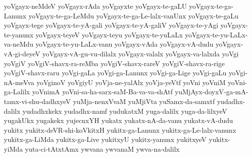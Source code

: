 {yoVgayx-neMdeV
yoVgayx-rAda
yoVgayxte
yoVgayx-te-gaLU
yoVgayx-te-ga-Lanunx
yoVgayx-te-ga-LeMdu
yoVgayx-te-ga-Le-lalx-vanUnx
yoVgayx-te-gaLu
yoVgayx-tege
yoVgayx-te-yA-gali
yoVgayx-te-yA-galiV
yoVgayx-te-yAgi
yoVgayx-te-yanunx
yoVgayx-teyeV
yoVgayx-teyu
yoVgayx-te-yuLaLx
yoVgayx-te-yu-LaLx-va-neMdu
yoVgayx-te-yu-LaLx-vanu
yoVgayx-vAda
yoVgayx-vA-dudu
yoVgayx-vA-gi-deyeV
yoVgayx-vA-gu-vu-dilalx
yoVgayx-valalx
yoVgayx-va-lalxda
yoVgi
yoVgiV
yoVgiV-shavx-ra-reMba
yoVgiV-shavx-rareV
yoVgiV-shavx-ra-rige
yoVgiV-shavx-raru
yoVgi-gaLa
yoVgi-ga-Lanunx
yoVgi-ga-Lige
yoVgi-gaLu
yoVgi-nA-meVva
yoVginoV
yoVgiyU
yoVja-ne-yalAlx
yoVja-yeVtf
yoVni
yoVniM
yoVni-ga-Lalilx
yoVnimA
yoVni-sa-ha-sarx-saM-Ba-va-va-shAtf
yuMjAyx-doyxV-ga-mA-tamx-vi-shu-dadhxyeV
yuMja-nenxVvaM
yuMjiVta
yuSamx-da-samxtf
yudadhx-dalilx
yudadhxkekx
yudadhx-namf
yudukatxM
yuga-dalilx
yuga-da-lilxyeV
yugakUkx
yugakekx
yujecnxYH
yukatx
yukatx-nA-da-vanu
yukatx-vA-dudu
yukitx
yukitx-deVR-shi-koVkitxH
yukitx-ga-Lanunx
yukitx-ga-Le-lalx-vanunx
yukitx-ga-LiMda
yukitx-ga-Live
yukitxyU
yukitx-yanunx
yukitxyeV
yukitx-yiMda
yuta-ci-tAtxtAmx
ywvana
ywvanaM
ywva-na-dalilx
‌
}
